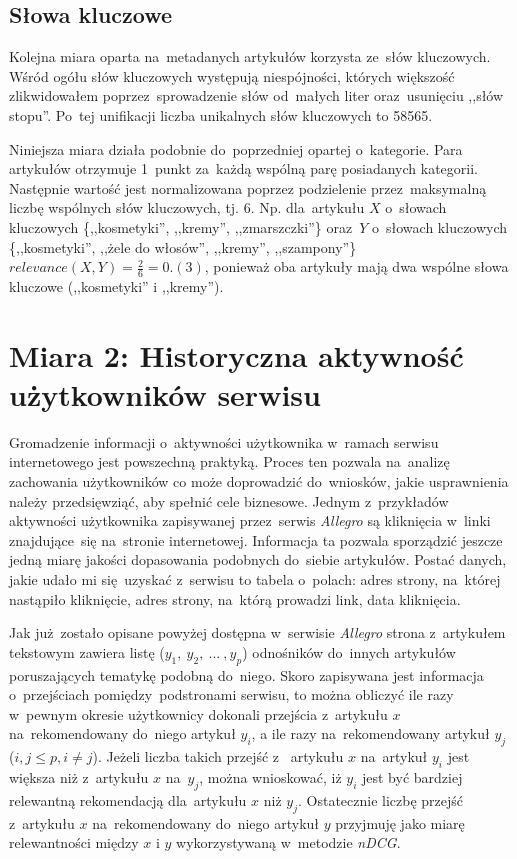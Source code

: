 \documentclass[pl]{minipw} %
\begin{document}
\subsection{Słowa kluczowe}

Kolejna miara oparta na~metadanych artykułów korzysta ze~słów kluczowych. Wśród ogółu słów kluczowych występują niespójności, których większość zlikwidowałem poprzez~sprowadzenie słów od~małych liter oraz~usunięciu ,,słów stopu''. Po~tej unifikacji liczba unikalnych słów kluczowych to 58565.

Niniejsza miara działa podobnie do~poprzedniej opartej o~kategorie. Para artykułów otrzymuje 1~punkt za~każdą wspólną parę posiadanych kategorii. Następnie wartość jest normalizowana poprzez podzielenie przez~maksymalną liczbę wspólnych słów kluczowych, tj. 6. Np. dla~artykułu $X$ o~słowach kluczowych \{,,kosmetyki'', ,,kremy'', ,,zmarszczki''\} oraz~$Y$ o~słowach kluczowych \{,,kosmetyki'', ,,żele do włosów'', ,,kremy'', ,,szampony''\} $relevance(X,Y)=\frac{2}{6}=0.(3)$, ponieważ oba artykuły mają dwa wspólne słowa kluczowe (,,kosmetyki'' i ,,kremy'').

\section{Miara 2: Historyczna aktywność użytkowników serwisu}

Gromadzenie informacji o~aktywności użytkownika w~ramach serwisu internetowego jest powszechną praktyką. Proces ten pozwala na~analizę zachowania użytkowników co może doprowadzić do~wniosków, jakie usprawnienia należy przedsięwziąć, aby spełnić cele biznesowe. Jednym z~przykładów aktywności użytkownika zapisywanej przez~serwis \textit{Allegro} są kliknięcia w~linki znajdujące~się na~stronie internetowej. Informacja ta pozwala sporządzić jeszcze jedną miarę jakości dopasowania podobnych do~siebie artykułów. Postać danych, jakie udało mi się~uzyskać z~serwisu to tabela o~polach: adres strony, na~której nastąpiło kliknięcie, adres strony, na~którą prowadzi link, data kliknięcia.

Jak już zostało opisane powyżej dostępna w~serwisie \textit{Allegro} strona z~artykułem tekstowym zawiera listę ($y_1,\ y_2,\ ...\ ,y_p$) odnośników do~innych artykułów poruszających tematykę podobną do~niego. Skoro zapisywana jest informacja o~przejściach pomiędzy~podstronami serwisu, to można obliczyć ile razy w~pewnym okresie użytkownicy dokonali przejścia z~artykułu $x$ na~rekomendowany do~niego artykuł $y_i$, a ile razy na~rekomendowany artykuł $y_j$ ($i,j \leq p, i\ne j$). Jeżeli liczba takich przejść z~ artykułu $x$ na~artykuł $y_i$ jest większa niż z~artykułu $x$ na~$y_j$, można wnioskować, iż $y_i$ jest być bardziej relewantną rekomendacją dla~artykułu $x$ niż $y_j$. Ostatecznie liczbę przejść z~artykułu $x$ na~rekomendowany do~niego artykuł $y$ przyjmuję jako miarę relewantności między $x$ i $y$ wykorzystywaną w~metodzie \textit{nDCG}.
\end{document}

